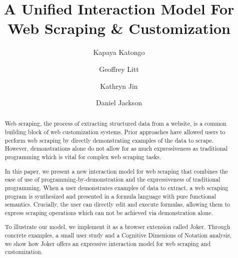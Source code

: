 \documentclass[sigconf,10pt]{acmart}
\begin{document}
\title{A Unified Interaction Model For Web Scraping \& Customization}


\author{Kapaya Katongo}

\author{Geoffrey Litt}

\author{Kathryn Jin}

\author{Daniel Jackson}


\begin{abstract}
  Web scraping, the process of extracting structured data from a
  website, is a common building block of web customization systems.
  Prior approaches have allowed users to perform web scraping by
  directly demonstrating examples of the data to scrape. However,
  demonstrations alone do not allow for as much expressiveness as
  traditional programming which is vital for complex web scraping tasks.

  In this paper, we present a new interaction model for web scraping
  that combines the ease of use of programming-by-demonstration and the
  expressiveness of traditional programming. When a user demonstrates
  examples of data to extract, a web scraping program is synthesized and
  presented in a formula language with pure functional semantics.
  Crucially, the user can directly edit and execute formulas, allowing
  them to express scraping operations which can not be achieved via
  demonstration alone.

  To illustrate our model, we implement it as a browser extension called
  Joker. Through concrete examples, a small user study and a Cognitive
  Dimenions of Notation analysis, we show how Joker offers an expressive
  interaction model for web scraping and customization.
\end{abstract}
\end{document}

